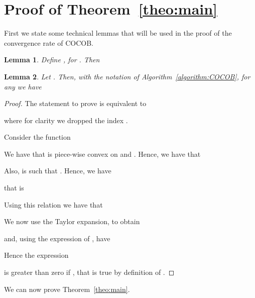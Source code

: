 \documentclass{article}
\newtheorem{lemma}{Lemma}
\begin{document}



\appendix

\section{Proof of Theorem~\ref{theo:main}}
\label{sec:proof_main}

First we state some technical lemmas that will be used in the proof of the convergence rate of COCOB.

\begin{lemma}{\cite[extended version, Lemma~18]{OrabonaP16b}}
\label{lemma:dual}
Define , for . Then

\end{lemma}

\begin{lemma}
\label{lemma:recurrence}
Let . Then, with the notation of Algorithm~\ref{algorithm:COCOB}, for any  we have

\end{lemma}
\begin{proof}
The statement to prove is equivalent to

where for clarity we dropped the index .

Consider the function 

We have that  is piece-wise convex on  and . Hence, we have that

Also,  is such that .
Hence, we have

that is


Using this relation we have that

We now use the Taylor expansion, to obtain

and, using the expression of , have

Hence the expression 

is greater than zero if , that is true by definition of .
\end{proof}

We can now prove Theorem~\ref{theo:main}.
\end{document}
